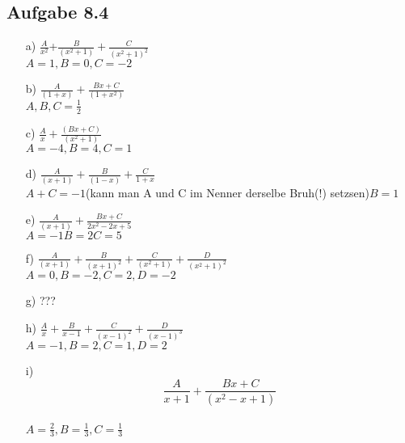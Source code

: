 \documentclass{standalone}
\begin{document}
\subsection{Aufgabe 8.4}
\begin{itemize}
	\item[a)]
	$\frac{A}{x^2}$+$\frac{B}{(x^2+1)}+\frac{C}{(x^2+1)^2}$\\
	$A=1, B=0, C=-2$
	\item[b)]
	$\frac{A}{(1+x)}+\frac{Bx+C}{(1+x^2)}$\\
	$A,B,C=\frac{1}{2}$
	\item[c)]
	$\frac{A}{x}+\frac{(Bx+C)}{(x^2+1)}$\\
	$A=-4, B=4, C=1$
	\item[d)]
	$\frac{A}{(x+1)}+\frac{B}{(1-x)}+\frac{C}{1+x}$\\
	$A+C=-1$(kann man A und C im Nenner derselbe Bruh(!) setzsen)$B=1$
	\item[e)]
	$\frac{A}{(x+1)}+\frac{Bx+C}{2x^2-2x+5}$\\
	$A=-1 B=2 C=5$
	\item[f)]
	$\frac{A}{(x+1)}+\frac{B}{(x+1)^2}+\frac{C}{(x^2+1)}+\frac{D}{(x^2+1)^2}$\\
	$A=0, B=-2, C=2, D=-2$
	\item[g)]
	???
	\item[h)]
	$\frac{A}{x}+\frac{B}{x-1}+\frac{C}{(x-1)^2}+\frac{D}{(x-1)^3}$\\
	$A=-1, B=2, C=1, D=2$
	\item[i)]
	$$\frac{A}{x+1}+\frac{Bx+C}{(x^2-x+1)}$$\\
	$A=\frac{2}{3}, B=\frac{1}{3}, C=\frac{1}{3}$
	
\end{itemize}
\end{document}
